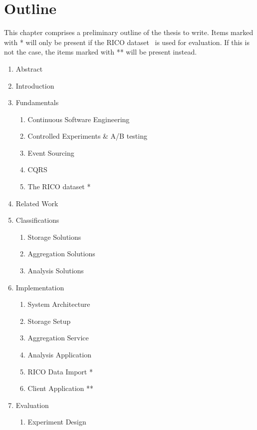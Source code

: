 %
\chapter{Outline}
\label{sec:outline}

This chapter comprises a preliminary outline of the thesis to write.
Items marked with * will only be present if the RICO dataset~\cite{Deka:2017:Rico} is used for evaluation.
If this is not the case, the items marked with ** will be present instead.

\begin{enumerate}[noitemsep,label=\arabic*.]
\item Abstract
\item Introduction
\item Fundamentals
	\begin{enumerate}[noitemsep,label=\arabic*.]
	\item Continuous Software Engineering
	\item Controlled Experiments \& A/B testing
	\item Event Sourcing
	\item CQRS
	\item The RICO dataset *
	\end{enumerate}
\item Related Work
\item Classifications
	\begin{enumerate}[noitemsep,label=\arabic*.]
	\item Storage Solutions
	\item Aggregation Solutions
	\item Analysis Solutions
	\end{enumerate}
\item Implementation
	\begin{enumerate}[noitemsep,label=\arabic*.]
	\item System Architecture
	\item Storage Setup
	\item Aggregation Service
	\item Analysis Application
	\item RICO Data Import *
	\item Client Application **
	\end{enumerate}
\item Evaluation
	\begin{enumerate}[noitemsep,label=\arabic*.]
	\item Experiment Design
		\begin{enumerate}[noitemsep,label=\arabic*.]

\end{enumerate}
\end{enumerate}
\end{enumerate}
